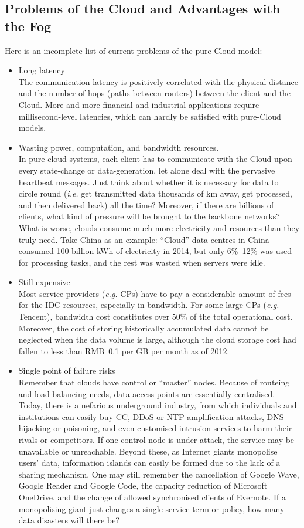 \subsection{Problems of the Cloud and Advantages with the Fog}
Here is an incomplete list of current problems of the pure Cloud model: 
\begin{itemize}
	\item Long latency\\
	The communication latency is positively correlated with the physical distance and the number of hops (paths between routers) between the client and the Cloud. More and more financial and industrial applications require millisecond-level latencies, which can hardly be satisfied with pure-Cloud models.   
	\item Wasting power, computation, and bandwidth resources.\\
	In pure-cloud systems, each client has to communicate with the Cloud upon every state-change or data-generation, let alone deal with the pervasive heartbeat messages. Just think about whether it is necessary for data to circle round ({\em i.e.} get transmitted data thousands of km away, get processed, and then delivered back) all the time? Moreover, if there are billions of clients, what kind of pressure will be brought to the backbone networks?  What is worse, clouds consume much more electricity and resources than they truly need. Take China as an example: ``Cloud'' data centres in China consumed 100 billion kWh of electricity in 2014, but only 6\%--12\% was used for processing tasks, and the rest was wasted when servers were idle. 
	\item Still expensive\\
	Most service providers ({\em e.g.} CPs) have to pay a considerable amount of fees for the IDC resources, especially in bandwidth. For some large CPs ({\em e.g.} Tencent), bandwidth cost constitutes over 50\% of the total operational cost. Moreover, the cost of storing historically accumulated data cannot be neglected when the data volume is large, although the cloud storage cost had fallen to less than RMB~0.1 per GB per month as of 2012. 
	\item Single point of failure risks\\
	Remember that clouds have control or ``master'' nodes. Because of routeing and load-balancing needs, data access points are essentially centralised. Today, there is a nefarious underground industry, from which individuals and institutions can easily buy CC, DDoS or NTP amplification attacks, DNS hijacking or poisoning, and even customised intrusion services to harm their rivals or competitors. If one control node is under attack, the service may be unavailable or unreachable. Beyond these, as Internet giants monopolise users' data, information islands can easily be formed due to the lack of a sharing mechanism. One may still remember the cancellation of Google Wave, Google Reader and Google Code, the capacity reduction of Microsoft OneDrive, and the change of allowed synchronised clients of Evernote. If a monopolising giant just changes a single service term or policy, how many data disasters will there be?   

\end{itemize}

